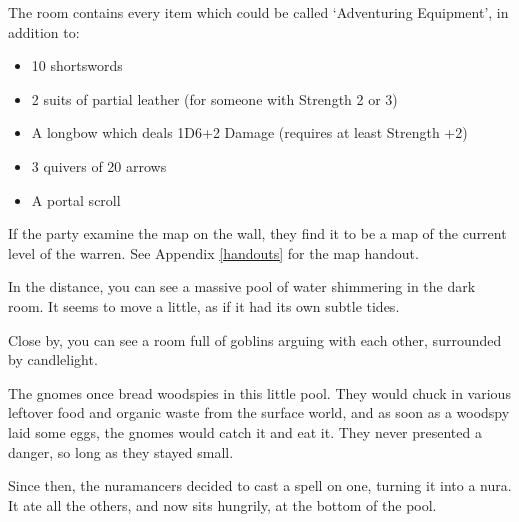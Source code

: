 \begin{multicols}{2}
\begin{boxtext}
\end{boxtext}

The room contains every item which could be called `Adventuring Equipment',
\iftoggle{core}{%
\footnote{See the core book, page \pageref{start_equipment}.}
}{}%
in addition to:

\begin{itemize}

  \item{10 shortswords}
  \item{2 suits of partial leather (for someone with Strength 2 or 3)}
  \iftoggle{hardcore}{%
  \item{1 suit of partial leather (for someone with Strength 1 or 2)}
  }{
  \item{2 suits of partial chain (for someone with Strength 1 or 2)}
  }
  \item{A longbow which deals 1D6+2 Damage (requires at least Strength +2)}
  \item{3 quivers of 20 arrows}
  \item{A portal scroll}

\end{itemize}

If the party examine the map on the wall, they find it to be a map of the current level of the warren.
See Appendix \ref{handouts} for the map handout.


\begin{boxtext}

  In the distance, you can see a massive pool of water shimmering in the dark room.
  It seems to move a little, as if it had its own subtle tides.

  Close by, you can see a room full of goblins arguing with each other, surrounded by candlelight.

\end{boxtext}

\begin{exampletext}

  The gnomes once bread woodspies in this little pool.
  They would chuck in various leftover food and organic waste from the surface world, and as soon as a woodspy laid some eggs, the gnomes would catch it and eat it.
  They never presented a danger, so long as they stayed small.

  Since then, the nuramancers decided to cast a spell on one, turning it into a nura.
  It ate all the others, and now sits hungrily, at the bottom of the pool.


\end{exampletext}
\end{multicols}

